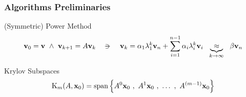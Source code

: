 \begin{frame}
  \frametitle{Algorithms Preliminaries}
  \begin{block}{(Symmetric) Power Method}
    \[
    \joinabove{0}
    \vec{v}_0 = \vec{v} \ds{\land}
    \vec{v}_{k+1} = A\vec{v}_k
    \ds{\ds{\suchthat}}
    \vec{v}_k = \alpha_1 \lambda_1^{k} \vec{v}_n +
    \sum\limits_{\tiny{i=1}}^{n-1} \alpha_i \lambda_i^{k} \vec{v}_i
    \ds{}
    \underbrace{\approx}_{k \to \infty}
    \ds{}    
    \beta \vec{v}_n
    \joinbelow{0}
    \]
  \end{block}
  \begin{block}{Krylov Subspaces}
    \[
    \joinabove{0}
    \Krylov{A}{\vec{x}_0}{m} =
    \func{span}
    \left\{
      A^0\vec{x}_0\ds{,} A^1\vec{x}_0\ds{,} \ldots \ds{,}  A^{(m-1)}\vec{x}_0
      \right\}
    \joinbelow{0}      
    \]
  \end{block}
\end{frame}
